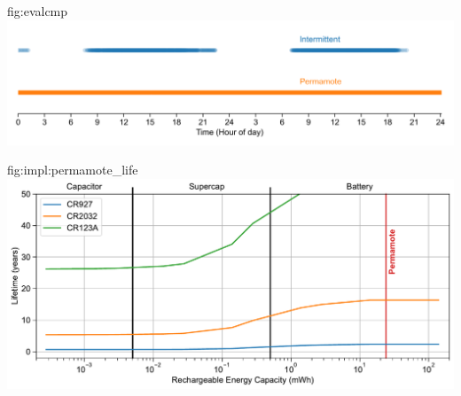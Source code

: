 \begin{definefigure}{fig:evalcmp}
    \centering
    \includegraphics[width=\linewidth]{figs/capacity/experiment_sys_compare/exp_packets_recv}
    \caption{
      \normalfont
        Packets received over two days.
      This figure compares the availability of an
      batteryless design and \name. \name sends a packet every second and does
      so without fail, while the batteryless system is only able to send when
      light is available.
      }
\end{definefigure}

\begin{definefigure}{fig:impl:permamote_life}
    \centering
    \includegraphics[width=\linewidth]{figs/capacity/primary/sense_and_send_life_vs_sec_size_permamote.pdf}
    \caption{
        Lifetime estimation of the \name sense and send workload given different rechargeable buffer sizes and different primary cell sizes. This figure utilizes the low irradiance Setup A environment (15\ssi[per-mode=symbol]{\micro\watt\per\centi\meter\squared}) and the 30 second sense and send workload period (24.5\ssi{\micro\watt}).
      This is a different presentation of \cref{fig:capacity:primary} that identifies the rechargeable capacity of \name with a red vertical line.
      }
    
\end{definefigure}

